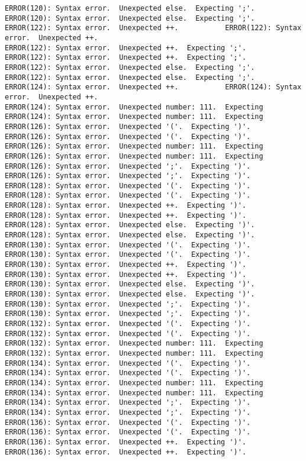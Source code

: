 \documentclass[12pt]{book}
\begin{document}
\begin{lstlisting}
ERROR(120): Syntax error.  Unexpected else.  Expecting ';'.	ERROR(120): Syntax error.  Unexpected else.  Expecting ';'.
ERROR(122): Syntax error.  Unexpected ++.			ERROR(122): Syntax error.  Unexpected ++.
ERROR(122): Syntax error.  Unexpected ++.  Expecting ';'.	ERROR(122): Syntax error.  Unexpected ++.  Expecting ';'.
ERROR(122): Syntax error.  Unexpected else.  Expecting ';'.	ERROR(122): Syntax error.  Unexpected else.  Expecting ';'.
ERROR(124): Syntax error.  Unexpected ++.			ERROR(124): Syntax error.  Unexpected ++.
ERROR(124): Syntax error.  Unexpected number: 111.  Expecting	ERROR(124): Syntax error.  Unexpected number: 111.  Expecting
ERROR(126): Syntax error.  Unexpected '('.  Expecting ')'.	ERROR(126): Syntax error.  Unexpected '('.  Expecting ')'.
ERROR(126): Syntax error.  Unexpected number: 111.  Expecting	ERROR(126): Syntax error.  Unexpected number: 111.  Expecting
ERROR(126): Syntax error.  Unexpected ';'.  Expecting ')'.	ERROR(126): Syntax error.  Unexpected ';'.  Expecting ')'.
ERROR(128): Syntax error.  Unexpected '('.  Expecting ')'.	ERROR(128): Syntax error.  Unexpected '('.  Expecting ')'.
ERROR(128): Syntax error.  Unexpected ++.  Expecting ')'.	ERROR(128): Syntax error.  Unexpected ++.  Expecting ')'.
ERROR(128): Syntax error.  Unexpected else.  Expecting ')'.	ERROR(128): Syntax error.  Unexpected else.  Expecting ')'.
ERROR(130): Syntax error.  Unexpected '('.  Expecting ')'.	ERROR(130): Syntax error.  Unexpected '('.  Expecting ')'.
ERROR(130): Syntax error.  Unexpected ++.  Expecting ')'.	ERROR(130): Syntax error.  Unexpected ++.  Expecting ')'.
ERROR(130): Syntax error.  Unexpected else.  Expecting ')'.	ERROR(130): Syntax error.  Unexpected else.  Expecting ')'.
ERROR(130): Syntax error.  Unexpected ';'.  Expecting ')'.	ERROR(130): Syntax error.  Unexpected ';'.  Expecting ')'.
ERROR(132): Syntax error.  Unexpected '('.  Expecting ')'.	ERROR(132): Syntax error.  Unexpected '('.  Expecting ')'.
ERROR(132): Syntax error.  Unexpected number: 111.  Expecting	ERROR(132): Syntax error.  Unexpected number: 111.  Expecting
ERROR(134): Syntax error.  Unexpected '('.  Expecting ')'.	ERROR(134): Syntax error.  Unexpected '('.  Expecting ')'.
ERROR(134): Syntax error.  Unexpected number: 111.  Expecting	ERROR(134): Syntax error.  Unexpected number: 111.  Expecting
ERROR(134): Syntax error.  Unexpected ';'.  Expecting ')'.	ERROR(134): Syntax error.  Unexpected ';'.  Expecting ')'.
ERROR(136): Syntax error.  Unexpected '('.  Expecting ')'.	ERROR(136): Syntax error.  Unexpected '('.  Expecting ')'.
ERROR(136): Syntax error.  Unexpected ++.  Expecting ')'.	ERROR(136): Syntax error.  Unexpected ++.  Expecting ')'.

\end{lstlisting}
\end{document}
